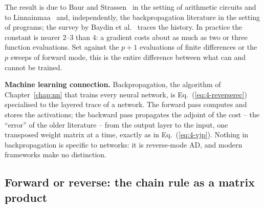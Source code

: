 The result is due to Baur and Strassen~\cite{baur1983} in the setting of
arithmetic circuits and to Linnainmaa~\cite{linnainmaa1976} and, independently,
the backpropagation literature in the setting of programs; the survey by
Baydin et al.~\cite{baydin2018} traces the history.  In practice the constant
is nearer $2$--$3$ than $4$: a gradient costs about as much as two or three
function evaluations.  Set against the $p+1$ evaluations of finite
differences or the $p$ sweeps of forward mode, this is the entire difference
between what can and cannot be trained.

\begin{notebox}
\textbf{Machine learning connection.}
Backpropagation, the algorithm of Chapter~\ref{chap:nn} that trains every
neural network, is Eq.~(\ref{eq:4-reverserec}) specialised to the layered
trace of a network.  The forward pass computes and stores the activations;
the backward pass propagates the adjoint of the cost -- the ``error'' of the
older literature -- from the output layer to the input, one transposed
weight matrix at a time, exactly as in Eq.~(\ref{eq:4-vjp}).  Nothing in
backpropagation is specific to networks: it is reverse-mode AD, and modern
frameworks make no distinction.
\end{notebox}

\subsection{Forward or reverse: the chain rule as a matrix product}
\label{sec:adorder}

